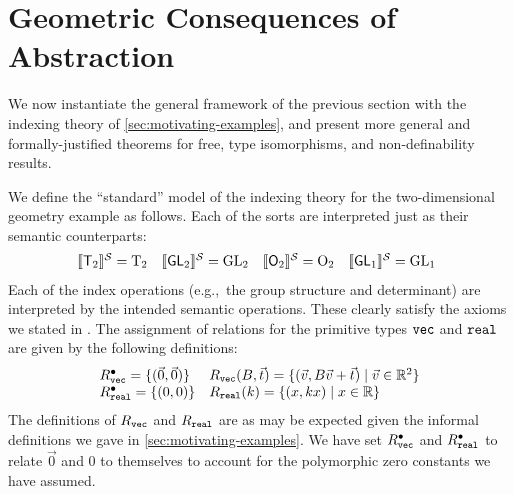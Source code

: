 \section{Geometric Consequences of Abstraction}
\label{sec:instantiations}
We now instantiate the general framework of the previous section with the indexing theory
of \autoref{sec:motivating-examples}, and present
more general and formally-justified theorems for free, type isomorphisms, and non-definability
results.

We define the ``standard''
  model of the indexing theory for the two-dimensional geometry
  example as follows. Each of the sorts are interpreted just as their
  semantic counterparts:
  \begin{displaymath}
    \begin{array}{@{}llll}
      \semSort{\SynTransl{2}} = \Transl{2}
      &
      \semSort{\SynGL{2}} = \GL{2}
      &
      \semSort{\SynOrth{2}} = \Orth{2}
      &
      \semSort{\SynGL{1}} = \GL{1}
    \end{array}
  \end{displaymath}
  Each of the index operations (e.g.,~the group structure and
  determinant) are interpreted by the intended semantic
  operations. These clearly satisfy the axioms we stated in
  . The assignment of relations for the
  primitive types $\textup{\texttt{vec}}$ and $\textup{\texttt{real}}$ are given by
  the following definitions:
  \begin{displaymath}
    \begin{array}{ll}
      R^{\bullet}_{\textup{\texttt{vec}}} = \{( \vec{0}, \vec{0} ) \}&
      R_{\textup{\texttt{vec}}}(B,\vec{t}) = \{ (\vec{v}, B\vec{v} + \vec{t}) \mathrel| \vec{v} \in \mathbb{R}^2 \} \\
      R^{\bullet}_{\textup{\texttt{real}}} = \{(0,0)\} &
      R_{\textup{\texttt{real}}}(k) = \{ (x, kx) \mathrel| x \in \mathbb{R} \}
    \end{array}
  \end{displaymath}
  The definitions of $R_{\textup{\texttt{vec}}}$ and $R_{\textup{\texttt{real}}}$
  are as may be expected given the informal definitions we gave in
  \autoref{sec:motivating-examples}. We have set
  $R^\bullet_{\textup{\texttt{vec}}}$ and $R^\bullet_{\textup{\texttt{real}}}$ to
  relate $\vec{0}$ and $0$ to themselves to account for the
  polymorphic zero constants we have assumed.


